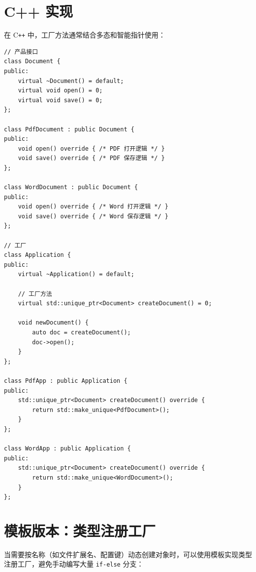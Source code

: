 \documentclass[12pt,a4paper,fontset=fandol]{ctexbook}
\begin{document}
\section{C++ 实现}

在 C\texttt{++} 中，工厂方法通常结合多态和智能指针使用：

\begin{lstlisting}[style=cppstyle, caption={工厂方法模式 --- C++ 实现}]
// 产品接口
class Document {
public:
    virtual ~Document() = default;
    virtual void open() = 0;
    virtual void save() = 0;
};

class PdfDocument : public Document {
public:
    void open() override { /* PDF 打开逻辑 */ }
    void save() override { /* PDF 保存逻辑 */ }
};

class WordDocument : public Document {
public:
    void open() override { /* Word 打开逻辑 */ }
    void save() override { /* Word 保存逻辑 */ }
};

// 工厂
class Application {
public:
    virtual ~Application() = default;

    // 工厂方法
    virtual std::unique_ptr<Document> createDocument() = 0;

    void newDocument() {
        auto doc = createDocument();
        doc->open();
    }
};

class PdfApp : public Application {
public:
    std::unique_ptr<Document> createDocument() override {
        return std::make_unique<PdfDocument>();
    }
};

class WordApp : public Application {
public:
    std::unique_ptr<Document> createDocument() override {
        return std::make_unique<WordDocument>();
    }
};
\end{lstlisting}

\section{模板版本：类型注册工厂}

当需要按名称（如文件扩展名、配置键）动态创建对象时，可以使用模板实现类型注册工厂，避免手动编写大量 \texttt{if-else} 分支：
\end{document}

